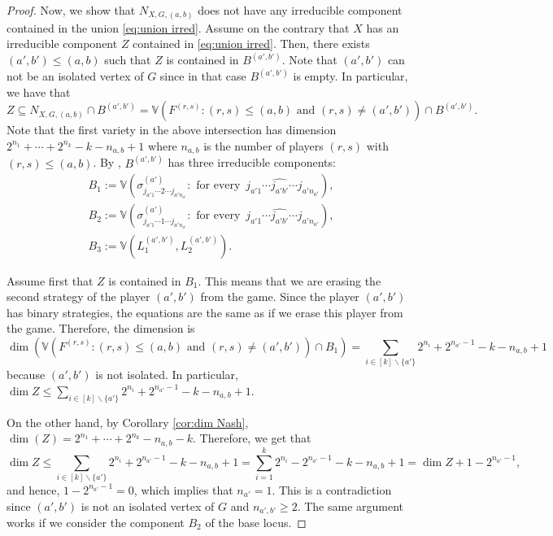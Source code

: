 \documentclass[11pt]{amsart}
\numberwithin{equation}{section}
\theoremstyle{plain}
\numberwithin{theorem}{section}
\theoremstyle{definition}
\begin{document}
\begin{proof}
    Now, we show that $N_{X,G,(a,b)}$ does not have any irreducible component contained in the union \eqref{eq:union irred}. Assume on the contrary that $X$ has an irreducible component $Z$ contained in \eqref{eq:union irred}. Then, there exists $(a',b')\leq (a,b)$ such that $Z$ is contained in $B^{(a',b')}$. Note that $(a',b')$ can not be an isolated vertex of $G$ since in that case $B^{(a',b')}$ is empty.
    In particular, we have that
    \[
    Z\subseteq N_{X,G,(a,b)}\cap B^{(a',b')} = \mathbb{V}(F^{(r,s)}:(r,s)\leq (a,b)\text{ and } (r,s)\neq (a',b')) \cap B^{(a',b')}.
    \]
    Note that the first variety in the above intersection has dimension  $2^{n_1}+\cdots + 2^{n_k}-k-n_{a,b}+1$ where $n_{a,b}$ is the number of players $(r,s)$ with $(r,s)\leq (a,b)$.
    By \cite[Lemma 8]{portakal2024game}, $ B^{(a',b')}$ has three irreducible components:
    \[
\begin{array}{l}
B_1:=   \mathbb{V}(\sigma^{(a')}_{j_{a'1}\cdots 2\cdots j_{a'n_{a'}}} :\text{ for every }\, j_{a'1}\cdots \widehat{j_{a'b'}}\cdots j_{a'n_{a'}}),
\\
B_2:=     \mathbb{V}(\sigma^{(a')}_{j_{a'1}\cdots 1\cdots j_{a'n_{a'}}} :\text{ for every }\, j_{a'1}\cdots \widehat{j_{a'b'}}\cdots j_{a'n_{a'}}),
     \\
 B_3:=    \mathbb{V}(L_1^{(a',b')},L_{2}^{(a',b')}).

     \end{array}
\]

Assume first that $Z$ is contained in $B_1$. This means that we are erasing the second strategy of the player $(a',b')$ from the game. Since the player  $(a',b')$ has binary strategies, the equations are the same as if we erase this player from the game. Therefore, the dimension is
\begin{equation*}
    \label{eq: ineq dim irred}
    \dim\left( \mathbb{V}(F^{(r,s)}:(r,s)\leq (a,b)\text{ and } (r,s)\neq (a',b'))\cap B_1\right) = \sum_{i\in [k]\backslash \{a'\}}2^{n_i}+2^{n_{a'}-1}-k-n_{a,b}+1
\end{equation*}
because $(a',b')$ is not isolated. In particular, $\displaystyle\dim Z\leq  \sum_{i\in [k]\backslash \{a'\}}2^{n_i}+2^{n_{a'}-1}-k-n_{a,b}+1$.

On the other hand, by Corollary \ref{cor:dim Nash}, $\dim(Z)=2^{n_1}+\cdots+ 2^{n_k}-n_{a,b}-k$. Therefore, we get that 
    \[
    \dim Z  \leq  \sum_{i\in [k]\backslash \{a'\}}2^{n_i}+2^{n_{a'}-1}-k-n_{a,b}+1= \sum_{i=1}^k2^{n_i}-2^{n_{a'}-1}-k-n_{a,b}+1=\dim Z+1-2^{n_{a'}-1},
    \]
    and hence, $1-2^{n_{a'}-1}=0$, which implies that $n_{a'}=1$. This is a contradiction since $(a',b')$ is not an isolated vertex of $G$ and $n_{a',b'}\geq 2$. The same argument works if we consider the component $B_2$ of the base locus.


\end{proof}
\end{document}
